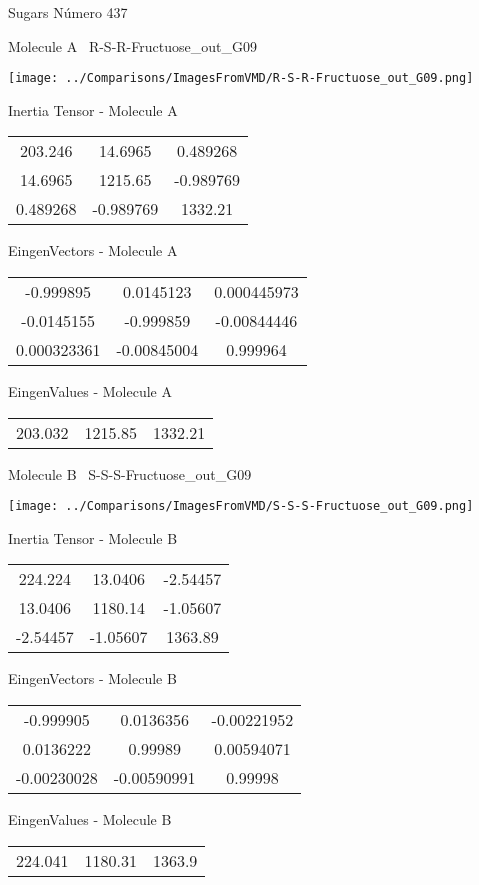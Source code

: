 \vtab[-3cm]
\begin{center}
{\large Sugars \tab Número 437}
\end{center}
\begin{multicols}{2}
\begin{center}

Molecule A \
R-S-R-Fructuose\_out\_G09

\texttt{[image: ../Comparisons/ImagesFromVMD/R-S-R-Fructuose\_out\_G09.png]}

Inertia Tensor - Molecule A \\
\begin{tabular}{|c c c|}
203.246	 & 	14.6965	 & 	0.489268	 \\
14.6965	 & 	1215.65	 & 	-0.989769	 \\
0.489268	 & 	-0.989769	 & 	1332.21
\end{tabular}

\vtab
 EingenVectors - Molecule A     \\
\begin{tabular}{|c c c|}
-0.999895	 & 	0.0145123	 & 	0.000445973	 \\
-0.0145155	 & 	-0.999859	 & 	-0.00844446	 \\
0.000323361	 & 	-0.00845004	 & 	0.999964
\end{tabular}

\vtab
 EingenValues - Molecule A     \\
\begin{tabular}{|c c c|}
203.032	 & 	1215.85	 & 	1332.21	 \\
\end{tabular}
\columnbreak

Molecule B \
S-S-S-Fructuose\_out\_G09

\texttt{[image: ../Comparisons/ImagesFromVMD/S-S-S-Fructuose\_out\_G09.png]}

Inertia Tensor - Molecule B \\
\begin{tabular}{|c c c|}
224.224	 & 	13.0406	 & 	-2.54457	 \\
13.0406	 & 	1180.14	 & 	-1.05607	 \\
-2.54457	 & 	-1.05607	 & 	1363.89
\end{tabular}

\vtab
 EingenVectors - Molecule B     \\
\begin{tabular}{|c c c|}
-0.999905	 & 	0.0136356	 & 	-0.00221952	 \\
0.0136222	 & 	0.99989	 & 	0.00594071	 \\
-0.00230028	 & 	-0.00590991	 & 	0.99998
\end{tabular}

\vtab
 EingenValues - Molecule B     \\
\begin{tabular}{|c c c|}
224.041	 & 	1180.31	 & 	1363.9	 \\
\end{tabular}

\end{center}
\end{multicols}

